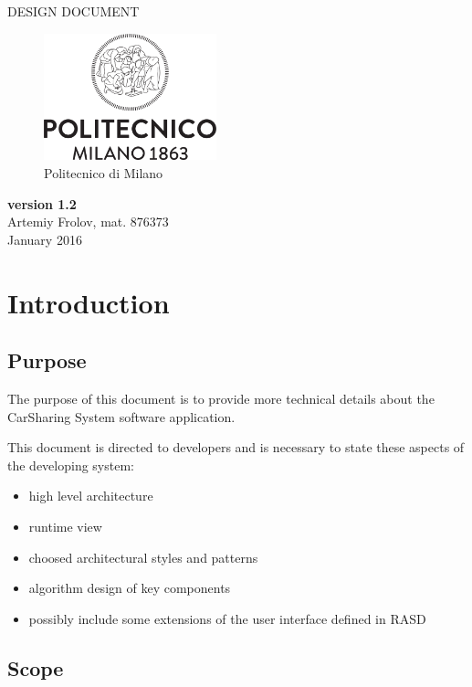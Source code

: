 \documentclass[12pt, letterpaper]{article}
\begin{document}
\begin{titlepage}
\centering
{\Large DESIGN DOCUMENT} \\
\begin{figure}[H]
\centering
\includegraphics[width=5cm]{Logo_Politecnico_Milano.png}
\caption{Politecnico di Milano}
\label{fig:PoliMi}
\end{figure}
\textbf{version 1.2} \\
\vspace{0.5cm}
Artemiy Frolov, mat. 876373 \\
\vspace{0.5cm}
January 2016
\end{titlepage}


\tableofcontents{}

\newpage

\section{Introduction}
\subsection{Purpose}

The purpose of this document is to provide more technical details about the CarSharing System software application.

This document is directed to developers and is necessary to state these aspects of the developing system: 
\begin{itemize}
	\item high level architecture 
	\item runtime view 
	\item choosed architectural styles and patterns
	\item algorithm design of key components 
	\item possibly include some extensions of the user interface defined in RASD 
\end{itemize}

\subsection{Scope}
\end{document}
